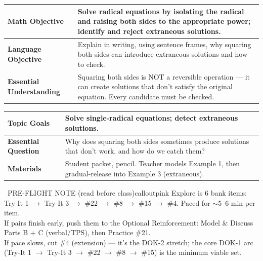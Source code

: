 \documentclass[11pt]{article}
\begin{document}

{\small
\renewcommand{\arraystretch}{1.25}
\noindent\begin{tabular}{|p{1.8in}|p{4.8in}|}
\hline
\textbf{Math Objective} & Solve radical equations by isolating the radical and raising both sides to the appropriate power; identify and reject extraneous solutions. \\ \hline
\textbf{Language Objective} & Explain in writing, using sentence frames, why squaring both sides can introduce extraneous solutions and how to check. \\ \hline
\textbf{Essential Understanding} & Squaring both sides is NOT a reversible operation --- it can create solutions that don't satisfy the original equation. Every candidate must be checked. \\ \hline
\end{tabular}
}

{\small
\renewcommand{\arraystretch}{1.25}
\noindent\begin{tabular}{|p{1.8in}|p{4.8in}|}
\hline
\textbf{Topic Goals} & Solve single-radical equations; detect extraneous solutions. \\ \hline
\textbf{Essential Question} & Why does squaring both sides sometimes produce solutions that don't work, and how do we catch them? \\ \hline
\textbf{Materials} & Student packet, pencil. Teacher models Example 1, then gradual-release into Example 3 (extraneous). \\ \hline
\end{tabular}
}

\begin{callout}{\IconPin\ PRE-FLIGHT NOTE (read before class)}{calloutpink}
Explore is 6 bank items: Try-It 1 \(\rightarrow\) Try-It 3 \(\rightarrow\) \#22 \(\rightarrow\) \#8 \(\rightarrow\) \#15 \(\rightarrow\) \#4. Paced for \(\sim\)5--6 min per item.\\
If pairs finish early, push them to the Optional Reinforcement: Model \& Discuss Parts B + C (verbal/TPS), then Practice \#21.\\
If pace slows, cut \#4 (extension) --- it's the DOK-2 stretch; the core DOK-1 arc (Try-It 1 \(\rightarrow\) Try-It 3 \(\rightarrow\) \#22 \(\rightarrow\) \#8 \(\rightarrow\) \#15) is the minimum viable set.
\end{callout}
\end{document}
